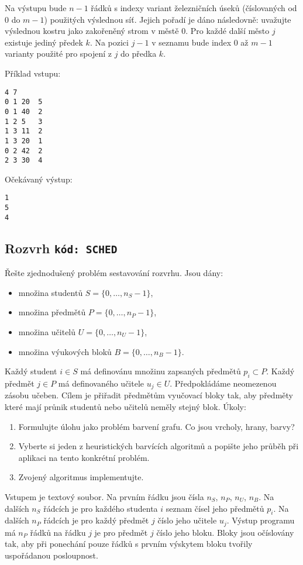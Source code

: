 \documentclass[a4paper,10pt]{article}
\begin{document}
Na výstupu bude $n-1$ řádků s indexy variant železničních úseků (číslovaných od $0$ do $m-1$) použitých výslednou síť. Jejich pořadí je dáno následovně:
uvažujte výslednou kostru jako zakořeněný strom v městě $0$. Pro každé další město $j$ existuje jediný předek $k$. Na pozici $j-1$ v seznamu bude index $0$ až $m-1$ 
varianty použité pro spojení z $j$ do předka $k$. 


Příklad vstupu:
\begin{verbatim}
4 7
0 1 20  5
0 1 40  2
1 2 5   3
1 3 11  2
1 3 20  1
0 2 42  2 
2 3 30  4
\end{verbatim}


Očekávaný výstup:
\begin{verbatim}
1
5
4
\end{verbatim}


\subsection{Rozvrh \hfill{\tt kód: SCHED}}
Řešte zjednodušený problém sestavování rozvrhu. Jsou dány:
\begin{itemize}
 \item množina studentů $S=\{0,\dots, n_S - 1\}$, 
 \item množina předmětů $P=\{0,\dots, n_P - 1\}$,
 \item množina učitelů  $U=\{0,\dots, n_U - 1\}$, 
 \item množina výukových bloků $B=\{0,\dots, n_B - 1\}$. 
\end{itemize}
Každý student $i\in S$ má definovánu množinu zapsaných předmětů $p_i \subset P$. 
Každý předmět $j\in P$ má definovaného učitele $u_j \in U$. Předpokládáme neomezenou zásobu učeben.
Cílem je přiřadit předmětům vyučovací bloky tak, aby předměty které mají průnik studentů nebo učitelů
neměly stejný blok.
Úkoly:
\begin{enumerate} 
 \item Formulujte úlohu jako problém barvení grafu. Co jsou vrcholy, hrany, barvy?
 \item Vyberte si jeden z heuristických barvících algoritmů a popište jeho průběh při aplikaci na tento konkrétní problém.
 \item Zvojený algoritmus implementujte.
\end{enumerate}

Vstupem je textový soubor. Na prvním řádku jsou čísla $n_S$, $n_P$, $n_U$, $n_B$.
Na dalších $n_S$ řádcích je pro každého studenta $i$ seznam čísel jeho předmětů $p_i$. 
Na dalších $n_P$ řádcích je pro každý předmět $j$ číslo jeho učitele $u_j$.
Výstup programu má $n_P$ řádků na řádku $j$ je pro předmět $j$ číslo jeho bloku. 
Bloky jsou očíslovány tak, aby při ponechání pouze řádků s prvním výskytem bloku
tvořily uspořádanou posloupnost.
\end{document}
